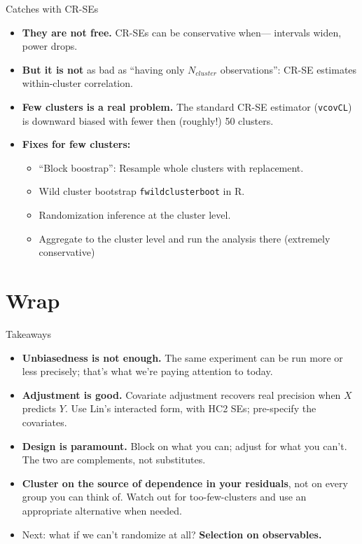\documentclass[xcolor=dvipsnames]{beamer}
\begin{document}
\begin{frame}{Catches with CR-SEs}
\small
\begin{itemize}
\item<1-> \textbf{They are not free.} CR-SEs can be 
  conservative when--- intervals widen, power drops.
\item<2-> \textbf{But it is not} as bad as ``having only $N_{cluster}$ observations'': CR-SE estimates within-cluster correlation. 
\item<3-> \textbf{Few clusters is a real problem.} The standard CR-SE
  estimator (\texttt{vcovCL}) is downward biased with fewer then (roughly!) 50 clusters.
\item<3-> \textbf{Fixes for few clusters:}
  \begin{itemize}
  \footnotesize
  \item ``Block boostrap'': Resample whole clusters with replacement. 
  \item Wild cluster bootstrap 
    \texttt{fwildclusterboot} in R.
  \item Randomization inference at the cluster level.
  \item Aggregate to the cluster level and run the analysis there (extremely conservative)
  \end{itemize}
\end{itemize}
\end{frame}


\section{Wrap}

\begin{frame}{Takeaways}
\begin{itemize}
\item \textbf{Unbiasedness is not enough.} The same experiment can be run
  more or less precisely; that's what we're paying attention to today.
\medskip
\item \textbf{Adjustment is good.} Covariate adjustment recovers real
  precision when $X$ predicts $Y$. Use Lin's interacted form, with HC2
  SEs; pre-specify the covariates.
\medskip
\item \textbf{Design is paramount.} Block on what you can; adjust for what you can't. 
The two are complements, not substitutes.
\medskip
\item \textbf{Cluster on the source of dependence in your residuals},
  not on every group you can think of. Watch out for too-few-clusters and use an appropriate alternative when needed.
\medskip
\item Next: what if we can't randomize at all? \textbf{Selection on observables.}
\end{itemize}
\end{frame}
\end{document}
